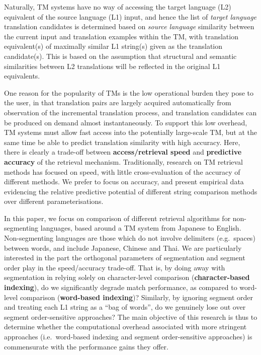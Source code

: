 Naturally, TM systems have no way of accessing the target language (L2)
equivalent of the source language (L1) input, and hence the list of
{\it target language} translation candidates is determined based on
{\it source language} similarity between the current input and
translation examples within the TM, with translation equivalent(s) of
maximally similar L1 string(s) given as the translation candidate(s).
This is based on the assumption that structural and semantic
similarities between L2 translations will be reflected in
the original L1 equivalents.
  
One reason for the popularity of TMs is the low operational burden they
pose to the user, in that translation pairs are largely acquired
automatically from observation of the incremental translation process,
and translation candidates can be produced on demand almost
instantaneously. To support this low overhead, TM systems must allow
fast access into the potentially large-scale TM, but at the same time be
able to predict translation similarity with high accuracy.  Here, there
is clearly a trade-off between {\bf access/retrieval speed} and
{\bf predictive accuracy} of the retrieval mechanism.
Traditionally, research on TM retrieval methods has focused on speed,
with little cross-evaluation of the accuracy of different methods.  We
prefer to focus on accuracy, and present empirical data evidencing the
relative predictive potential of different string comparison methods over
different parameterisations.

In this paper, we focus on comparison of different retrieval algorithms
for non-segmenting languages, based around a TM system from Japanese to
English.  Non-segmenting languages are those which do not involve
delimiters (e.g.\ spaces) between words, and include Japanese, Chinese
and Thai.  We are particularly interested in the part the orthogonal
parameters of segmentation and segment order play in the speed/accuracy
trade-off. That is, by doing away with segmentation in relying solely on
character-level comparison ({\bf character-based indexing}), do we
significantly degrade match performance, as compared to word-level
comparison ({\bf word-based indexing})? Similarly, by ignoring
segment order and treating each L1 string as a ``bag of words'', do we
genuinely lose out over segment order-sensitive approaches?  The main
objective of this research is thus to determine whether the
computational overhead associated with more stringent approaches (i.e.\ 
word-based indexing and segment order-sensitive approaches) is
commensurate with the performance gains they offer.

